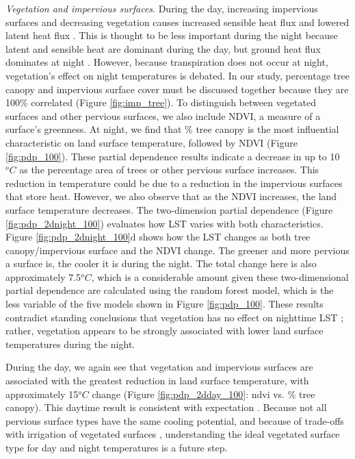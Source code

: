 \documentclass[final,3p,times,twocolumn,sort&compress]{elsarticle}
\begin{document}
\textit{Vegetation and impervious surfaces}. 
During the day, increasing impervious surfaces and decreasing vegetation causes increased sensible heat flux and lowered latent heat flux \cite{Voogt2003-mm, Peng2012-iy, Zhou2014-wc}.
This is thought to be less important during the night because latent and sensible heat are dominant during the day, but ground heat flux dominates at night \cite{Zhou2014-wc, Voogt2003-mm}.
However, because transpiration does not occur at night, vegetation's effect on night temperatures is debated. 
In our study, percentage tree canopy and impervious surface cover must be discussed together because they are 100\% correlated (Figure \ref{fig:imp_tree}).
To distinguish between vegetated surfaces and other pervious surfaces, we also include NDVI, a measure of a surface's greenness.
At night, we find that \% tree canopy is the most influential characteristic on land surface temperature, followed by NDVI (Figure \ref{fig:pdp_100}).
These partial dependence results indicate a decrease in up to 10$^oC$ as the percentage area of trees or other pervious surface increases.
This reduction in temperature could be due to a reduction in the impervious surfaces that store heat.
However, we also observe that as the NDVI increases, the land surface temperature decreases.
The two-dimension partial dependence (Figure \ref{fig:pdp_2dnight_100}) evaluates how LST varies with both characteristics.
Figure \ref{fig:pdp_2dnight_100}d shows how the LST changes as both tree canopy/impervious surface and the NDVI change.
The greener and more pervious a surface is, the cooler it is during the night. 
The total change here is also approximately 7.5$^oC$, which is a considerable amount given these two-dimensional partial dependence are calculated using the random forest model, which is the less variable of the five models shown in Figure \ref{fig:pdp_100}.
These results contradict standing conclusions that vegetation has no effect on nighttime LST \cite{Peng2012-iy, Zhou2014-wc};
rather, vegetation appears to be strongly associated with lower land surface temperatures during the night.

During the day, we again see that vegetation and impervious surfaces are associated with the greatest reduction in land surface temperature, with approximately 15$^oC$ change (Figure \ref{fig:pdp_2dday_100}: ndvi vs. \% tree canopy). 
This daytime result is consistent with expectation \cite{Chun2017-mm, Peng2018-cp, Wang2019-tree,Zhou2014-wc, Chun2018-so}.
Because not all pervious surface types have the same cooling potential, and because of trade-offs with irrigation of vegetated surfaces \cite{Gober2009-im}, understanding the ideal vegetated surface type for day and night temperatures is a future step.
\end{document}

